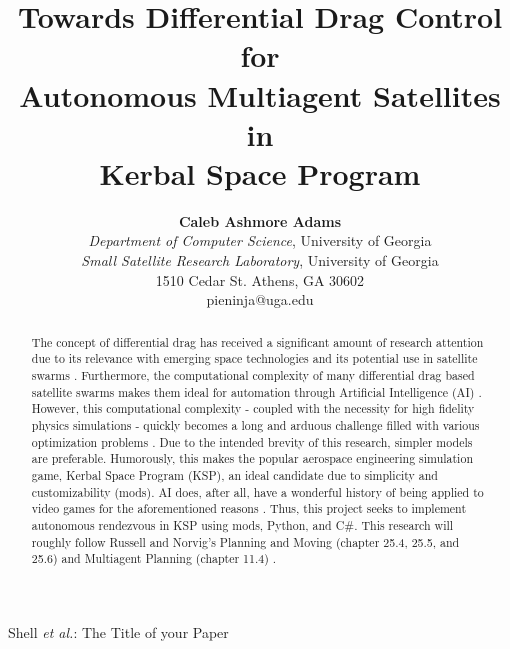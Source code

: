 \documentclass[journal,a4paper,12pt]{IEEEtran}
\begin{document}
%
\title{Towards Differential Drag Control for\\ Autonomous Multiagent Satellites in\\ Kerbal Space Program}

\author{
\textbf{Caleb Ashmore Adams}\\
\textit{Department of Computer Science}, University of Georgia\\
\textit{Small Satellite Research Laboratory}, University of Georgia\\
1510 Cedar St. Athens, GA 30602\\
pieninja@uga.edu
}


%
{Shell \MakeLowercase{\textit{et al.}}: The Title of your Paper}
%

\maketitle

\begin{abstract}
  The concept of differential drag has received a significant amount of research
  attention due to its relevance with emerging space technologies and its potential
  use in satellite swarms \cite{horsley}. Furthermore, the computational complexity
  of many differential drag based satellite swarms makes them ideal for automation
  through Artificial Intelligence (AI) \cite{swarm_ai}. However, this computational
  complexity - coupled with the necessity for high fidelity physics simulations -
  quickly becomes a long and arduous challenge filled with various optimization
  problems \cite{sin}. Due to the intended brevity of this research, simpler models
  are preferable. Humorously, this makes the popular aerospace engineering simulation
  game, Kerbal Space Program (KSP), an ideal candidate due to simplicity and
  customizability (mods). AI does, after all, have a wonderful history of being
  applied to video games for the aforementioned reasons \cite{ai_games_book}\cite{wiki_ai_games}.
  Thus, this project seeks to implement autonomous rendezvous
  in KSP using mods, Python, and C\#. This research will roughly follow
  Russell and Norvig’s Planning and Moving (chapter  25.4, 25.5, and 25.6) and Multiagent
  Planning (chapter 11.4) \cite{class_book}.

\end{abstract}
\end{document}
